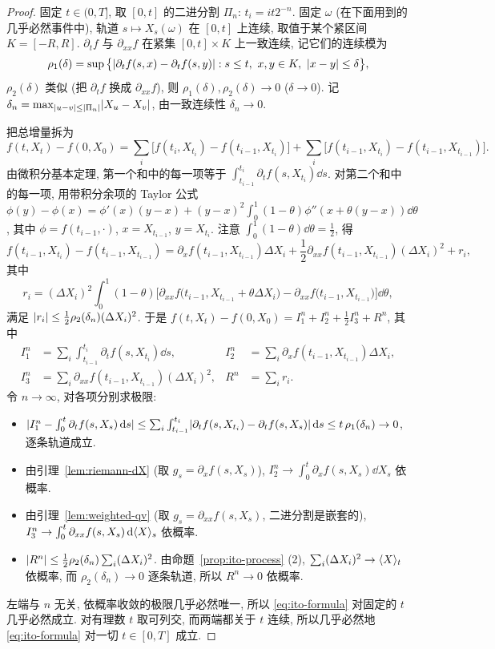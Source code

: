 \begin{proof}
固定 $t\in(0,T]$, 取 $[0,t]$ 的二进分割 $\Pi_n$: $t_i=it2^{-n}$. 固定 $\omega$ (在下面用到的几乎必然事件中), 轨道 $s\mapsto X_s(\omega)$ 在 $[0,t]$ 上连续, 取值于某个紧区间 $K=[-R,R]$. $\partial_tf$ 与 $\partial_{xx}f$ 在紧集 $[0,t]\times K$ 上一致连续, 记它们的连续模为
\[
\rho_1(\delta)=\sup\big\{\lvert\partial_tf(s,x)-\partial_tf(s,y)\rvert: s\le t,\ x,y\in K,\ \lvert x-y\rvert\le\delta\big\},
\]
$\rho_2(\delta)$ 类似 (把 $\partial_tf$ 换成 $\partial_{xx}f$), 则 $\rho_1(\delta),\rho_2(\delta)\to0$ ($\delta\to0$). 记 $\delta_n=\max_{\lvert u-v\rvert\le\lvert\Pi_n\rvert}\lvert X_u-X_v\rvert$, 由一致连续性 $\delta_n\to0$.

把总增量拆为
\[
f(t,X_t)-f(0,X_0)=\sum_i\Big[f(t_i,X_{t_i})-f(t_{i-1},X_{t_i})\Big]+\sum_i\Big[f(t_{i-1},X_{t_i})-f(t_{i-1},X_{t_{i-1}})\Big].
\]
由微积分基本定理, 第一个和中的每一项等于 $\int_{t_{i-1}}^{t_i}\partial_tf(s,X_{t_i})\dd s$. 对第二个和中的每一项, 用带积分余项的 Taylor 公式 $\phi(y)-\phi(x)=\phi'(x)(y-x)+(y-x)^2\int_0^1(1-\theta)\phi''(x+\theta(y-x))\dd\theta$, 其中 $\phi=f(t_{i-1},\cdot)$, $x=X_{t_{i-1}}$, $y=X_{t_i}$. 注意 $\int_0^1(1-\theta)\dd\theta=\frac{1}{2}$, 得
\[
f(t_{i-1},X_{t_i})-f(t_{i-1},X_{t_{i-1}})=\partial_xf(t_{i-1},X_{t_{i-1}})\Delta X_i+\frac{1}{2}\partial_{xx}f(t_{i-1},X_{t_{i-1}})(\Delta X_i)^2+r_i,
\]
其中
\[
r_i=(\Delta X_i)^2\int_0^1(1-\theta)\Big[\partial_{xx}f\big(t_{i-1},X_{t_{i-1}}+\theta\Delta X_i\big)-\partial_{xx}f\big(t_{i-1},X_{t_{i-1}}\big)\Big]\dd\theta,
\]
满足 $\lvert r_i\rvert\le\frac{1}{2}\rho_2(\delta_n)(\Delta X_i)^2$.
于是 $f(t,X_t)-f(0,X_0)=I_1^n+I_2^n+\frac{1}{2}I_3^n+R^n$, 其中
\begin{align*}
I_1^n&=\sum_i\int_{t_{i-1}}^{t_i}\partial_tf(s,X_{t_i})\dd s, & I_2^n&=\sum_i\partial_xf(t_{i-1},X_{t_{i-1}})\Delta X_i,\\
I_3^n&=\sum_i\partial_{xx}f(t_{i-1},X_{t_{i-1}})(\Delta X_i)^2, & R^n&=\sum_ir_i.
\end{align*}
令 $n\to\infty$, 对各项分别求极限:
\begin{itemize}
\item $\lvert I_1^n-\int_0^t\partial_tf(s,X_s)\mathop{}\!\mathrm{d} s\rvert\le\sum_i\int_{t_{i-1}}^{t_i}\lvert\partial_tf(s,X_{t_i})-\partial_tf(s,X_s)\rvert\mathop{}\!\mathrm{d} s\le t\,\rho_1(\delta_n)\to0$, 逐条轨道成立.
\item 由引理~\ref{lem:riemann-dX} (取 $g_s=\partial_xf(s,X_s)$), $I_2^n\to\int_0^t\partial_xf(s,X_s)\dd X_s$ 依概率.
\item 由引理~\ref{lem:weighted-qv} (取 $g_s=\partial_{xx}f(s,X_s)$, 二进分割是嵌套的), $I_3^n\to\int_0^t\partial_{xx}f(s,X_s)\mathop{}\!\mathrm{d}\langle X\rangle_s$ 依概率.
\item $\lvert R^n\rvert\le\frac{1}{2}\rho_2(\delta_n)\sum_i(\Delta X_i)^2$. 由命题~\ref{prop:ito-process} (2), $\sum_i(\Delta X_i)^2\to\langle X\rangle_t$ 依概率, 而 $\rho_2(\delta_n)\to0$ 逐条轨道, 所以 $R^n\to0$ 依概率.
\end{itemize}
左端与 $n$ 无关, 依概率收敛的极限几乎必然唯一, 所以 \eqref{eq:ito-formula} 对固定的 $t$ 几乎必然成立. 对有理数 $t$ 取可列交, 而两端都关于 $t$ 连续, 所以几乎必然地 \eqref{eq:ito-formula} 对一切 $t\in[0,T]$ 成立.
\end{proof}

